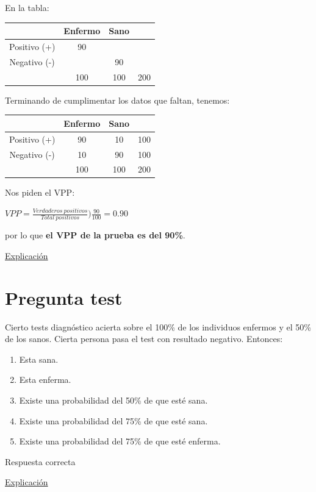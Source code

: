 \documentclass[
]{book}
\providecommand{\tightlist}{%
  \setlength{\itemsep}{0pt}\setlength{\parskip}{0pt}}
\begin{document}
En la tabla:

\begin{longtable}[]{@{}cccc@{}}
\toprule
& Enfermo & Sano &\tabularnewline
\midrule
\endhead
Positivo (+) & 90 & &\tabularnewline
Negativo (-) & & 90 &\tabularnewline
& 100 & 100 & 200\tabularnewline
\bottomrule
\end{longtable}

Terminando de cumplimentar los datos que faltan, tenemos:

\begin{longtable}[]{@{}cccc@{}}
\toprule
& Enfermo & Sano &\tabularnewline
\midrule
\endhead
Positivo (+) & 90 & 10 & 100\tabularnewline
Negativo (-) & 10 & 90 & 100\tabularnewline
& 100 & 100 & 200\tabularnewline
\bottomrule
\end{longtable}

Nos piden el VPP:

\(VPP=\frac{Verdaderos ~ positivos}{Total ~ positivos})\frac{90}{100}=0.90\)

por lo que \textbf{el VPP de la prueba es del 90\%}.

\href{https://1fjmanzano.github.io/bioestadistica/relaci\%C3\%B3n-entre-variables-cualitativas.html\#diagno\%CC\%81stico-cli\%CC\%81nico}{Explicación}

\hypertarget{pregunta-test-145}{%
\section{Pregunta test}\label{pregunta-test-145}}

Cierto tests diagnóstico acierta sobre el 100\% de los individuos enfermos y el 50\% de los sanos. Cierta persona pasa el test con resultado negativo. Entonces:

\begin{enumerate}
\def\labelenumi{\alph{enumi})}
\tightlist
\item
  Esta sana.
\item
  Esta enferma.
\item
  Existe una probabilidad del 50\% de que esté sana.
\item
  Existe una probabilidad del 75\% de que esté sana.
\item
  Existe una probabilidad del 75\% de que esté enferma.
\end{enumerate}

Respuesta correcta

\href{https://1fjmanzano.github.io/bioestadistica/relaci\%C3\%B3n-entre-variables-cualitativas.html\#diagno\%CC\%81stico-cli\%CC\%81nico}{Explicación}
\end{document}
